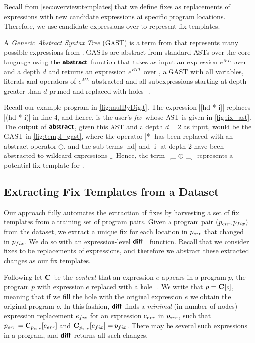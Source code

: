 Recall from \autoref{sec:overview:templates} that we define fixes as
replacements of expressions with new candidate expressions at specific program
locations. Therefore, we use candidate expressions over \repairLang to represent
fix templates.

A \emph{Generic Abstract Syntax Tree} (GAST) is a term from \repairLang that
represents many possible expressions from \lang. GASTs are abstract from
standard ASTs over the core language \lang using the $\bm{\mathsf{abstract}}$ function that
takes as input an expression $e^{ML}$ over \lang and a depth $d$ and returns an
expression $e^{RTL}$ over \repairLang, \ie a GAST with all variables, literals
and operators of $e^{ML}$ abstracted and all subexpressions starting at depth
greater than $d$ pruned and replaced with holes $\_$.

Recall our example program \mbd in \autoref{fig:mulByDigit}.
%
The expression |[hd * i]| replaces |(hd * i)| in line 4, and hence, is the
user's \emph{fix}, whose AST is given in \autoref{fig:fix_ast}.
%
The output of $\bm{\mathsf{abstract}}$, given this AST and a depth $d = 2$ as input, would be
the GAST in \autoref{fig:templ_gast}, where the operator |*| has been replaced
with an abstract operator $\oplus$, and the sub-terms |hd| and |i| at depth 2
have been abstracted to wildcard expressions $\_$.
%
Hence, the \repairLang term |[_ $\oplus$ _]| represents a potential fix template
for \mbd.



\subsection{Extracting Fix Templates from a Dataset}
\label{sec:templ-partition:templates}

Our approach fully automates the extraction of fixes by harvesting a set of fix
templates from a training set of program pairs.
%
Given a program pair $(p_{err}, p_{fix})$ from the dataset, we extract a unique fix
for each location in $p_{err}$ that changed in $p_{fix}$.
%
We do so with an expression-level $\bm{\mathsf{diff}}$~\citep{Lempsink2009-xf} function.
%
Recall that we consider fixes to be replacements of expressions, and
therefore we abstract these extracted changes as our fix templates.

%
Following \cite{Felleisen92} let $\mathbf{C}_{}$ be the \emph{context} that an
expression $e$ appears in a program $p$, \ie the program $p$ with expression $e$
replaced with a hole $\_$.
%
We write that $p = \mathbf{C}_{}[e]$, meaning that if we fill the hole with the
original expression $e$ we obtain the original program $p$.
%
In this fashion, $\bm{\mathsf{diff}}$ finds a \emph{minimal} (in number of nodes)
expression replacement $e_{fix}$ for an expression $e_{err}$ in $p_{err}$, such that
$p_{err} = \mathbf{C}_{p_{err}}[e_{err}]$ and $\mathbf{C}_{p_{err}}[e_{fix}] = p_{fix}$.
%
There may be several such expressions in a program, and $\bm{\mathsf{diff}}$ returns all
such changes.

